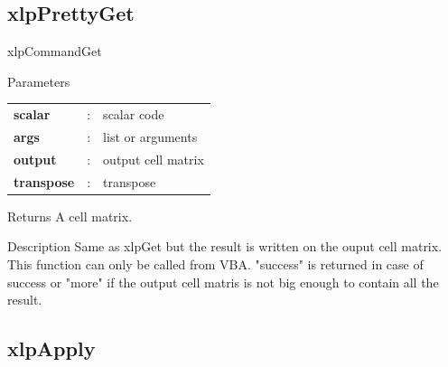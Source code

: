 \subsection{xlpPrettyGet}

\begin{xlpfunctitle}{xlpCommandGet}

\begin{xlpfunc}{Parameters}
\begin{tabular}{p{3.5cm}cl}
\textbf{scalar}& : & scalar code \\
\textbf{args}& : & list or arguments \\
\textbf{output}& : & output cell matrix\\
\textbf{transpose}& : & transpose   \\
\end{tabular}

\vspace{2mm}

\end{xlpfunc}


\begin{xlpfunc}{Returns}
A cell matrix.
\end{xlpfunc}

\begin{xlpfunc}{Description}
Same as xlpGet but the result is written on the ouput cell matrix. This function can only be called from VBA. "success" is returned in case of success or "more" if the output cell matris is not big enough to contain all the result.
\end{xlpfunc}
\end{xlpfunctitle}


\subsection{xlpApply}

